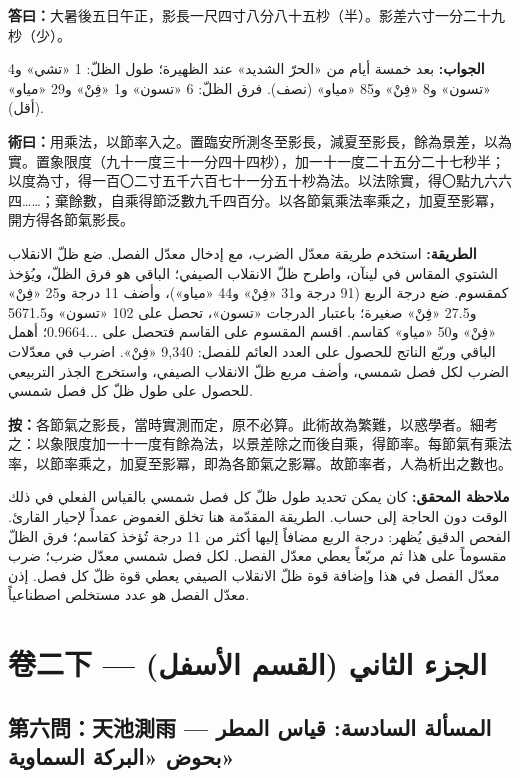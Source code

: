 \documentclass[11pt,a4paper]{article}
\newcommand{\ar}[1]{\arabicfont\beginR #1\endR}
\newcommand{\answer}[2]{\par\noindent%
  \begin{minipage}[t]{0.48\textwidth}\textbf{答曰：}#1\end{minipage}%
  \hfill%
  \begin{minipage}[t]{0.48\textwidth}\arabicfont\beginR\textbf{الجواب:} #2\endR\end{minipage}\par\vspace{0.2cm}}
\newcommand{\method}[2]{\par\noindent%
  \begin{minipage}[t]{0.48\textwidth}\textbf{術曰：}#1\end{minipage}%
  \hfill%
  \begin{minipage}[t]{0.48\textwidth}\arabicfont\beginR\textbf{الطريقة:} #2\endR\end{minipage}\par\vspace{0.3cm}}
\newcommand{\editornote}[2]{\par\noindent%
  \begin{minipage}[t]{0.48\textwidth}\textbf{按：}#1\end{minipage}%
  \hfill%
  \begin{minipage}[t]{0.48\textwidth}\arabicfont\beginR\textbf{ملاحظة المحقق:} #2\endR\end{minipage}\par\vspace{0.2cm}}
\begin{document}
\answer{大暑後五日午正，影長一尺四寸八分八十五杪（半）。影差六寸一分二十九杪（少）。}{بعد خمسة أيام من «الحرّ الشديد» عند الظهيرة؛ طول الظلّ: 1 «تشي» و4 «تسون» و8 «فِنْ» و85 «مياو» (نصف). فرق الظلّ: 6 «تسون» و1 «فِنْ» و29 «مياو» (أقل).}

\method{用乘法，以節率入之。置臨安所測冬至影長，減夏至影長，餘為景差，以為實。置象限度（九十一度三十一分四十四杪），加一十一度二十五分二十七秒半；以度為寸，得一百〇二寸五千六百七十一分五十杪為法。以法除實，得〇點九六六四……；棄餘數，自乘得節泛數九千四百分。以各節氣乘法率乘之，加夏至影冪，開方得各節氣影長。}{استخدم طريقة معدّل الضرب، مع إدخال معدّل الفصل. ضع ظلّ الانقلاب الشتوي المقاس في لينآن، واطرح ظلّ الانقلاب الصيفي؛ الباقي هو فرق الظلّ، ويُؤخذ كمقسوم. ضع درجة الربع (91 درجة و31 «فِنْ» و44 «مياو»)، وأضف 11 درجة و25 «فِنْ» و27.5 «فِنْ» صغيرة؛ باعتبار الدرجات «تسون»، تحصل على 102 «تسون» و5671.5 «فِنْ» و50 «مياو» كقاسم. اقسم المقسوم على القاسم فتحصل على $0.9664\ldots$؛ أهمل الباقي وربّع الناتج للحصول على العدد العائم للفصل: 9,340 «فِنْ». اضرب في معدّلات الضرب لكل فصل شمسي، وأضف مربع ظلّ الانقلاب الصيفي، واستخرج الجذر التربيعي للحصول على طول ظلّ كل فصل شمسي.}

\editornote{各節氣之影長，當時實測而定，原不必算。此術故為繁難，以惑學者。細考之：以象限度加一十一度有餘為法，以景差除之而後自乘，得節率。每節氣有乘法率，以節率乘之，加夏至影冪，即為各節氣之影冪。故節率者，人為析出之數也。}{كان يمكن تحديد طول ظلّ كل فصل شمسي بالقياس الفعلي في ذلك الوقت دون الحاجة إلى حساب. الطريقة المقدّمة هنا تخلق الغموض عمداً لإحيار القارئ. الفحص الدقيق يُظهر: درجة الربع مضافاً إليها أكثر من 11 درجة تُؤخذ كقاسم؛ فرق الظلّ مقسوماً على هذا ثم مربّعاً يعطي معدّل الفصل. لكل فصل شمسي معدّل ضرب؛ ضرب معدّل الفصل في هذا وإضافة قوة ظلّ الانقلاب الصيفي يعطي قوة ظلّ كل فصل. إذن معدّل الفصل هو عدد مستخلص اصطناعياً.}

\newpage

\section*{卷二下 — \ar{الجزء الثاني (القسم الأسفل)}}

\subsection*{第六問：天池測雨 — \ar{المسألة السادسة: قياس المطر بحوض «البركة السماوية»}}
\end{document}
